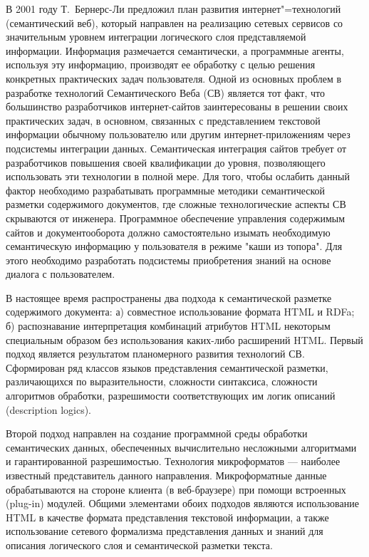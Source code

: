 \documentclass[utf8]{../IncArticle}
\begin{document}
\introduction{}

В 2001 году Т.~Бернерс-Ли предложил план развития интернет"=технологий
(семантический веб), который направлен на реализацию сетевых сервисов
со значительным уровнем интеграции логического слоя представляемой
информации.  Информация размечается семантически, а программные
агенты, используя эту информацию, производят ее обработку с целью
решения конкретных практических задач пользователя. Одной из основных
проблем в разработке технологий Семантического Веба (СВ) является тот факт,
что большинство разработчиков интернет-сайтов заинтересованы в решении
своих практических задач, в основном, связанных с представлением
текстовой информации обычному пользователю или другим
интернет-приложениям через подсистемы интеграции данных.
Семантическая интеграция сайтов требует от разработчиков повышения
своей квалификации до уровня, позволяющего использовать эти технологии
в полной мере.  Для того, чтобы ослабить данный фактор необходимо
разрабатывать программные методики семантической разметки содержимого
документов, где сложные технологические аспекты СВ
скрываются от инженера.  Программное обеспечение управления содержимым
сайтов и документооборота должно самостоятельно изымать необходимую
семантическую информацию у пользователя в режиме "каши из топора".
Для этого необходимо разработать подсистемы приобретения знаний на
основе диалога с пользователем.

В настоящее время распространены два подхода к семантической разметке содержимого
документа: а) совместное использование формата HTML и RDFa; б)
распознавание интерпретация комбинаций атрибутов HTML некоторым
специальным образом без использования каких-либо расширений HTML.  Первый подход является
результатом планомерного развития технологий СВ.  Сформирован ряд
классов языков представления семантической
разметки, различающихся по выразительности, сложности синтаксиса,
сложности алгоритмов обработки, разрешимости соответствующих им
логик описаний (description logics).

Второй подход направлен на создание программной среды обработки
семантических данных, обеспеченных вычислительно несложными
алгоритмами и гарантированной разрешимостью.  Технология микроформатов
\cite{b2:2} --- наиболее известный представитель данного направления.
Микроформатные данные обрабатываются на стороне клиента (в
веб-браузере) при помощи встроенных (plug-in) модулей.  Общими
элементами обоих подходов являются использование HTML в качестве
формата представления текстовой информации, а также использование сетевого
формализма представления данных и знаний для описания логического
слоя и семантической разметки текста.
\end{document}
